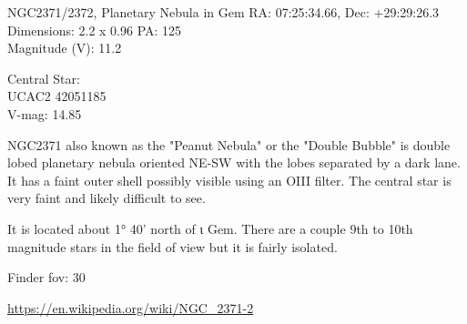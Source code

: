 \begin{block}{NGC2371/2372, Planetary Nebula in Gem}
    RA: 07:25:34.66, Dec: +29:29:26.3 \\ 
    Dimensions: 2.2 x 0.96 PA: 125 \\ 
    Magnitude (V): 11.2

    Central Star: \\ 
      \hspace{1em}UCAC2 42051185 \\ 
      \hspace{1em}V-mag: 14.85 

    NGC2371 also known as the "Peanut Nebula" or the "Double Bubble" is double
    lobed planetary nebula oriented NE-SW with the lobes separated by a dark
    lane. It has a faint outer shell possibly visible using an OIII filter. The
    central star is very faint and likely difficult to see.

    It is located about 1° 40' north of ι Gem. There are a couple 9th to 10th
    magnitude stars in the field of view but it is fairly isolated.
    
    Finder fov: 30 

    \url{https://en.wikipedia.org/wiki/NGC_2371-2} 
\end{block}
